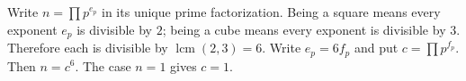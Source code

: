 Write $n=\prod p^{e_p}$ in its unique prime factorization. Being a square means every exponent $e_p$ is divisible by $2$; being a cube means every exponent is divisible by $3$. Therefore each is divisible by $\operatorname{lcm}(2,3)=6$. Write $e_p=6f_p$ and put $c=\prod p^{f_p}$. Then $\boxed{n=c^6}$. The case $n=1$ gives $c=1$.
